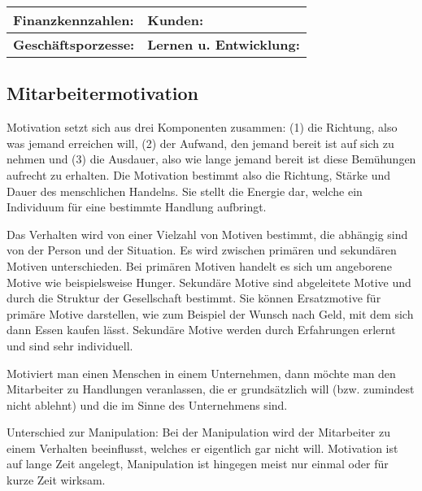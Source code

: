\begin{tabular}{|p{6cm}|p{6cm}|}
	\hline
	{\bf Finanzkennzahlen:}\vspace{3cm} & {\bf Kunden:}\vspace{3cm} \\
	\hline
	{\bf Geschäftsporzesse:}\vspace{3cm} & {\bf Lernen u. Entwicklung:}\vspace{3cm}\\
	\hline
\end{tabular}


\subsection{Mitarbeitermotivation}
Motivation setzt sich aus drei Komponenten zusammen: (1) die Richtung, also was jemand erreichen will, (2) der Aufwand, den jemand bereit ist auf sich zu nehmen und (3) die Ausdauer, also wie lange jemand bereit ist diese Bemühungen aufrecht zu erhalten. Die Motivation bestimmt also die Richtung, Stärke und Dauer des menschlichen Handelns. Sie stellt die Energie dar, welche ein Individuum für eine bestimmte Handlung aufbringt.

Das Verhalten wird von einer Vielzahl von Motiven bestimmt, die abhängig sind von der Person und der Situation. Es wird zwischen primären und sekundären Motiven unterschieden. Bei primären Motiven handelt es sich um angeborene Motive wie beispielsweise Hunger. Sekundäre Motive sind abgeleitete Motive und durch die Struktur der Gesellschaft bestimmt. Sie können Ersatzmotive für primäre Motive darstellen, wie zum Beispiel der Wunsch nach Geld, mit dem sich dann Essen kaufen lässt. Sekundäre Motive werden durch Erfahrungen erlernt und sind sehr individuell.

Motiviert man einen Menschen in einem Unternehmen, dann möchte man den Mitarbeiter zu Handlungen veranlassen, die er grundsätzlich will (bzw. zumindest nicht ablehnt) und die im Sinne des Unternehmens sind.

Unterschied zur Manipulation: Bei der Manipulation wird der Mitarbeiter zu einem Verhalten beeinflusst, welches er eigentlich gar nicht will.
Motivation ist auf lange Zeit angelegt, Manipulation ist hingegen meist nur einmal oder für kurze Zeit wirksam.

